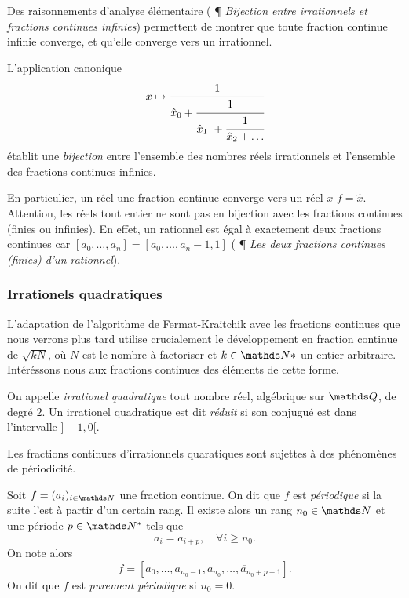 Des raisonnements d'analyse élémentaire (\cite{wikiu} ¶ \emph{Bijection entre
irrationnels et fractions continues infinies}) permettent de montrer que toute
fraction continue infinie converge, et qu'elle converge vers un irrationnel.

\begin{theoreme}
	L'application canonique \[x \mapsto \cfrac{1}{\hat{x}_0 +
	\cfrac{1}{\hat{x}_1 + \cfrac{1}{\hat{x}_2 + \dots}}}\] établit une
	\emph{bijection} entre l'ensemble des nombres réels irrationnels et
	l'ensemble des fractions continues infinies.
\end{theoreme}

En particulier, un réel une fraction continue converge vers un réel $x$ \ssi
$f=\hat{x}$. Attention, les réels tout entier ne sont pas en bijection avec les
fractions continues (finies ou infinies). En effet, un rationnel est égal à
exactement deux fractions continues car $[a_0, \dots, a_n] = [a_0, \dots, a_n -
1, 1]$ (\cite{wikiu} ¶ \emph{Les deux fractions continues (finies) d'un
rationnel}).

\subsubsection{Irrationels quadratiques}

L'adaptation de l'algorithme de Fermat-Kraitchik avec les fractions continues
que nous verrons plus tard utilise crucialement le développement en fraction
continue de $\sqrt{kN}$, où $N$ est le nombre à factoriser et $k\in \N*$ un
entier arbitraire. Intéréssons nous aux fractions continues des éléments de
cette forme.

\begin{definition}
	On appelle \emph{irrationel quadratique} tout nombre réel, algébrique sur
	$\Q$, de degré $2$. Un irrationel quadratique est dit \emph{réduit} si son
	conjugué est dans l'intervalle $]-1, 0[$.
\end{definition}

Les fractions continues d'irrationnels quaratiques sont sujettes à des
phénomènes de périodicité.

\begin{definition}
	Soit $f = (a_i)_{i\in \N}$ une fraction continue. On dit que $f$ est
	\emph{périodique} si la suite l'est à partir d'un certain rang. Il existe
	alors un rang $n_0\in \N$ et une période $p\in \N^*$ tels que \[a_{i} =
	a_{i+p}, \quad \forall i\geq n_0.\] On note alors \[f = [a_0, \dots, a_{n_0
	- 1}, \overline{a_{n_0}, \dots, a_{n_0 + p -1}}].\] On dit que $f$ est
	\emph{purement périodique} si $n_0 = 0$.
\end{definition}

